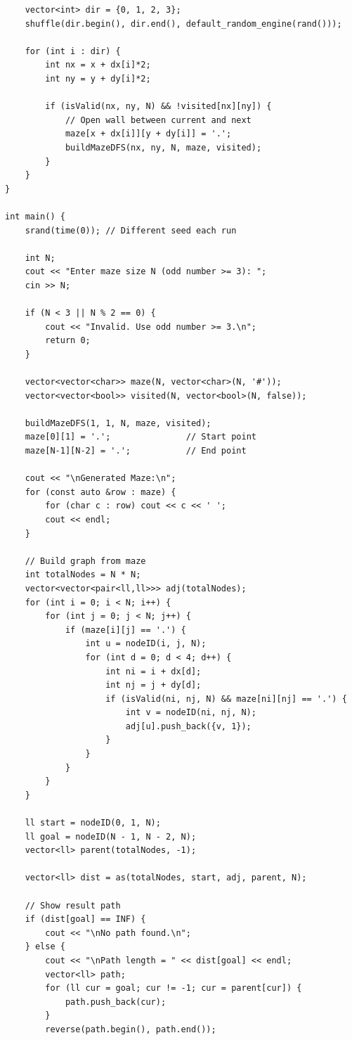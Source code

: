 \documentclass[a4paper,12pt]{article}
\begin{document}
\begin{tcolorbox}[breakable, enhanced, colback=white, title={Complete Version}, colframe=gray!40]
\begin{lstlisting}
    vector<int> dir = {0, 1, 2, 3};
    shuffle(dir.begin(), dir.end(), default_random_engine(rand()));

    for (int i : dir) {
        int nx = x + dx[i]*2;
        int ny = y + dy[i]*2;

        if (isValid(nx, ny, N) && !visited[nx][ny]) {
            // Open wall between current and next
            maze[x + dx[i]][y + dy[i]] = '.';
            buildMazeDFS(nx, ny, N, maze, visited);
        }
    }
}

int main() {
    srand(time(0)); // Different seed each run

    int N;
    cout << "Enter maze size N (odd number >= 3): "; 
    cin >> N;

    if (N < 3 || N % 2 == 0) {
        cout << "Invalid. Use odd number >= 3.\n";
        return 0;
    }

    vector<vector<char>> maze(N, vector<char>(N, '#'));
    vector<vector<bool>> visited(N, vector<bool>(N, false));

    buildMazeDFS(1, 1, N, maze, visited);
    maze[0][1] = '.';               // Start point
    maze[N-1][N-2] = '.';           // End point

    cout << "\nGenerated Maze:\n";
    for (const auto &row : maze) {
        for (char c : row) cout << c << ' ';
        cout << endl;
    }

    // Build graph from maze
    int totalNodes = N * N;
    vector<vector<pair<ll,ll>>> adj(totalNodes);
    for (int i = 0; i < N; i++) {
        for (int j = 0; j < N; j++) {
            if (maze[i][j] == '.') {
                int u = nodeID(i, j, N);
                for (int d = 0; d < 4; d++) {
                    int ni = i + dx[d];
                    int nj = j + dy[d];
                    if (isValid(ni, nj, N) && maze[ni][nj] == '.') {
                        int v = nodeID(ni, nj, N);
                        adj[u].push_back({v, 1});
                    }
                }
            }
        }
    }

    ll start = nodeID(0, 1, N);         
    ll goal = nodeID(N - 1, N - 2, N);  
    vector<ll> parent(totalNodes, -1);

    vector<ll> dist = as(totalNodes, start, adj, parent, N);

    // Show result path
    if (dist[goal] == INF) {
        cout << "\nNo path found.\n";
    } else {
        cout << "\nPath length = " << dist[goal] << endl;
        vector<ll> path;
        for (ll cur = goal; cur != -1; cur = parent[cur]) {
            path.push_back(cur);
        }
        reverse(path.begin(), path.end());


\end{lstlisting}
\end{tcolorbox}
\end{document}
